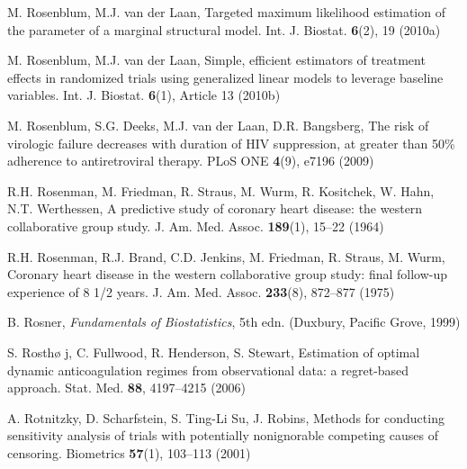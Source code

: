 \begin{list}{}{\setlength{\leftmargin}{2.1em}\setlength{\labelwidth}{0pt}
  \setlength{\labelsep}{0pt}\setlength{\itemindent}{-2.1em}
  \setlength{\parsep}{0pt}\setlength{\itemsep}{2pt}\setlength{\topsep}{0pt}}
\item\label{refentry:REF327}M. Rosenblum, M.J. van der Laan, Targeted maximum likelihood estimation of the parameter of a marginal structural model. Int. J. Biostat. \textbf{6}(2), 19 (2010a)\label{refend:REF327}
\item\label{refentry:REF328}M. Rosenblum, M.J. van der Laan, Simple, efficient estimators of treatment effects in randomized trials using generalized linear models to leverage baseline variables. Int. J. Biostat. \textbf{6}(1), Article 13 (2010b)\label{refend:REF328}
\item\label{refentry:REF329}M. Rosenblum, S.G. Deeks, M.J. van der Laan, D.R. Bangsberg, The risk of virologic failure decreases with duration of HIV suppression, at greater than 50\% adherence to antiretroviral therapy. PLoS ONE \textbf{4}(9), e7196 (2009)\label{refend:REF329}
\item\label{refentry:REF330}R.H. Rosenman, M. Friedman, R. Straus, M. Wurm, R. Kositchek, W. Hahn, N.T. Werthessen, A predictive study of coronary heart disease: the western collaborative group study. J. Am. Med. Assoc. \textbf{189}(1), 15--22 (1964)\label{refend:REF330}
\item\label{refentry:REF331}R.H. Rosenman, R.J. Brand, C.D. Jenkins, M. Friedman, R. Straus, M. Wurm, Coronary heart disease in the western collaborative group study: final follow-up experience of 8 1/2 years. J. Am. Med. Assoc. \textbf{233}(8), 872--877 (1975)\label{refend:REF331}
\item\label{refentry:REF332}B. Rosner, \textit{Fundamentals} \textit{of} \textit{Biostatistics}, 5th edn. (Duxbury, Pacific Grove, 1999)\label{refend:REF332}
\item\label{refentry:REF333}S. Rosthø j, C. Fullwood, R. Henderson, S. Stewart, Estimation of optimal dynamic anticoagulation regimes from observational data: a regret-based approach. Stat. Med. \textbf{88}, 4197--4215 (2006)\label{refend:REF333}
\item\label{refentry:REF334}A. Rotnitzky, D. Scharfstein, S. Ting-Li Su, J. Robins, Methods for conducting sensitivity analysis of trials with potentially nonignorable competing causes of censoring. Biometrics \textbf{57}(1), 103--113 (2001)\label{refend:REF334}

\end{list}
